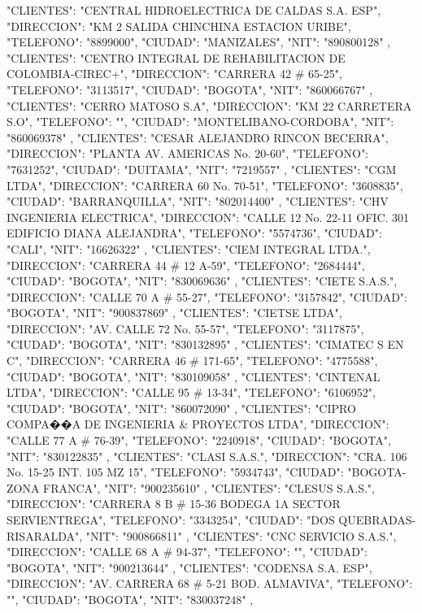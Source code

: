    {
   "CLIENTES": "CENTRAL HIDROELECTRICA DE CALDAS S.A. ESP",
   "DIRECCION": "KM 2 SALIDA CHINCHINA ESTACION URIBE",
   "TELEFONO": "8899000",
   "CIUDAD": "MANIZALES",
   "NIT": "890800128"
   },
   {
   "CLIENTES": "CENTRO INTEGRAL DE REHABILITACION DE COLOMBIA-CIREC+",
   "DIRECCION": "CARRERA 42 # 65-25",
   "TELEFONO": "3113517",
   "CIUDAD": "BOGOTA",
   "NIT": "860066767"
   },
   {
   "CLIENTES": "CERRO MATOSO S.A",
   "DIRECCION": "KM 22 CARRETERA S.O",
   "TELEFONO": "",
   "CIUDAD": "MONTELIBANO-CORDOBA",
   "NIT": "860069378"
   },
   {
   "CLIENTES": "CESAR ALEJANDRO RINCON BECERRA",
   "DIRECCION": "PLANTA AV. AMERICAS No. 20-60",
   "TELEFONO": "7631252",
   "CIUDAD": "DUITAMA",
   "NIT": "7219557"
   },
   {
   "CLIENTES": "CGM LTDA",
   "DIRECCION": "CARRERA 60 No. 70-51",
   "TELEFONO": "3608835",
   "CIUDAD": "BARRANQUILLA",
   "NIT": "802014400"
   },
   {
   "CLIENTES": "CHV INGENIERIA ELECTRICA",
   "DIRECCION": "CALLE 12 No. 22-11 OFIC. 301 EDIFICIO DIANA ALEJANDRA",
   "TELEFONO": "5574736",
   "CIUDAD": "CALI",
   "NIT": "16626322"
   },
   {
   "CLIENTES": "CIEM INTEGRAL LTDA.",
   "DIRECCION": "CARRERA 44 # 12 A-59",
   "TELEFONO": "2684444",
   "CIUDAD": "BOGOTA",
   "NIT": "830069636"
   },
   {
   "CLIENTES": "CIETE S.A.S.",
   "DIRECCION": "CALLE 70 A # 55-27",
   "TELEFONO": "3157842",
   "CIUDAD": "BOGOTA",
   "NIT": "900837869"
   },
   {
   "CLIENTES": "CIETSE LTDA",
   "DIRECCION": "AV. CALLE 72 No. 55-57",
   "TELEFONO": "3117875",
   "CIUDAD": "BOGOTA",
   "NIT": "830132895"
   },
   {
   "CLIENTES": "CIMATEC S EN C",
   "DIRECCION": "CARRERA 46 # 171-65",
   "TELEFONO": "4775588",
   "CIUDAD": "BOGOTA",
   "NIT": "830109058"
   },
   {
   "CLIENTES": "CINTENAL LTDA",
   "DIRECCION": "CALLE 95 # 13-34",
   "TELEFONO": "6106952",
   "CIUDAD": "BOGOTA",
   "NIT": "860072090"
   },
   {
   "CLIENTES": "CIPRO COMPA��A DE INGENIERIA & PROYECTOS LTDA",
   "DIRECCION": "CALLE 77 A # 76-39",
   "TELEFONO": "2240918",
   "CIUDAD": "BOGOTA",
   "NIT": "830122835"
   },
   {
   "CLIENTES": "CLASI S.A.S.",
   "DIRECCION": "CRA. 106 No. 15-25 INT. 105 MZ 15",
   "TELEFONO": "5934743",
   "CIUDAD": "BOGOTA-ZONA FRANCA",
   "NIT": "900235610"
   },
   {
   "CLIENTES": "CLESUS S.A.S.",
   "DIRECCION": "CARRERA 8 B # 15-36 BODEGA 1A SECTOR SERVIENTREGA",
   "TELEFONO": "3343254",
   "CIUDAD": "DOS QUEBRADAS-RISARALDA",
   "NIT": "900866811"
   },
   {
   "CLIENTES": "CNC SERVICIO S.A.S.",
   "DIRECCION": "CALLE 68 A # 94-37",
   "TELEFONO": "",
   "CIUDAD": "BOGOTA",
   "NIT": "900213644"
   },
   {
   "CLIENTES": "CODENSA S.A. ESP",
   "DIRECCION": "AV. CARRERA 68 # 5-21 BOD. ALMAVIVA",
   "TELEFONO": "",
   "CIUDAD": "BOGOTA",
   "NIT": "830037248"
   },

